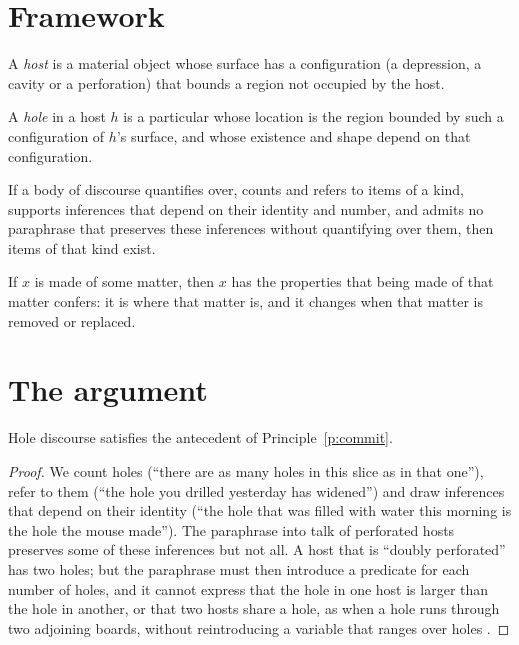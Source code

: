 \documentclass{situationist-preprint}
\begin{document}
\section{Framework}

\begin{definition}\label{d:host}
A \emph{host} is a material object whose surface has a configuration (a depression, a cavity or a perforation) that bounds a region not occupied by the host.
\end{definition}

\begin{definition}\label{d:hole}
A \emph{hole} in a host $h$ is a particular whose location is the region bounded by such a configuration of $h$'s surface, and whose existence and shape depend on that configuration.
\end{definition}

\begin{principle}\label{p:commit}
If a body of discourse quantifies over, counts and refers to items of a kind, supports inferences that depend on their identity and number, and admits no paraphrase that preserves these inferences without quantifying over them, then items of that kind exist.
\end{principle}

\begin{principle}\label{p:matter}
If $x$ is made of some matter, then $x$ has the properties that being made of that matter confers: it is where that matter is, and it changes when that matter is removed or replaced.
\end{principle}

\section{The argument}

\begin{lemma}\label{l:particular}
Hole discourse satisfies the antecedent of Principle~\ref{p:commit}.
\end{lemma}

\begin{proof}
We count holes (\enquote{there are as many holes in this slice as in that one}), refer to them (\enquote{the hole you drilled yesterday has widened}) and draw inferences that depend on their identity (\enquote{the hole that was filled with water this morning is the hole the mouse made}). The paraphrase into talk of perforated hosts preserves some of these inferences but not all. A host that is \enquote{doubly perforated} has two holes; but the paraphrase must then introduce a predicate for each number of holes, and it cannot express that the hole in one host is larger than the hole in another, or that two hosts share a hole, as when a hole runs through two adjoining boards, without reintroducing a variable that ranges over holes \citep{LewisLewis1970,CasatiVarzi1994}.
\end{proof}
\end{document}
